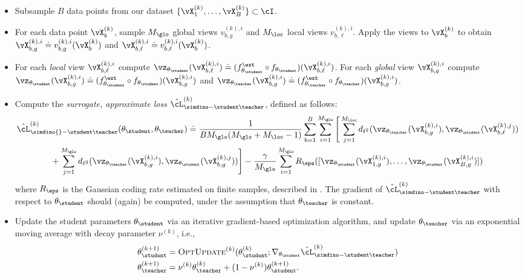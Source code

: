 \documentclass[../../book-main.tex]{subfiles}
\begin{document}
\begin{itemize}
    \item Subsample \(B\) data points from our dataset \(\{\vX_{1}^{(k)}, \dots, \vX_{B}^{(k)}\} \subset \cI\).
    \item For each data point \(\vX_{b}^{(k)}\), sample \(M_{\glo}\) global views \(v_{b, g}^{(k), i}\) and \(M_{\loc}\) local views \(v_{b, \ell}^{(k), i}\). Apply the views to \(\vX_{b}^{(k)}\) to obtain \(\vX_{b, g}^{(k), i} \doteq v_{b, g}^{(k), i}(\vX_{b}^{(k)})\) and \(\vX_{b, \ell}^{(k), i} \doteq v_{b, \ell}^{(k), i}(\vX_{b}^{(k)})\).
    \item For each \textit{local} view \(\vX_{b, \ell}^{(k), i}\) compute \(\vz_{\theta_{\student}}(\vX_{b, \ell}^{(k), i}) \doteq (f_{\theta_{\student}}^{\ext} \circ f_{\theta_{\student}})(\vX_{b, \ell}^{(k), i})\). For each \textit{global} view \(\vX_{b, g}^{(k), i}\) compute \(\vz_{\theta_{\student}}(\vX_{b, g}^{(k), i}) \doteq (f_{\theta_{\student}}^{\ext} \circ f_{\theta_{\student}})(\vX_{b, g}^{(k), i})\) and \(\vz_{\theta_{\teacher}}(\vX_{b, g}^{(k), i}) \doteq (f_{\theta_{\teacher}}^{\ext} \circ f_{\theta_{\teacher}})(\vX_{b, g}^{(k), i})\).
    \item Compute the \textit{surrogate, approximate loss} \(\hat{\cL}_{\simdino-\student\teacher}^{(k)}\), defined as follows: 
    \begin{align}\label{eq:simdino_loss_teacherstudent_empirical}
        &\hat{\cL}_{\simdino{}-\student\teacher}^{(k)}(\theta_{\student}, \theta_{\teacher}) \doteq
        \frac{1}{BM_{\glo}(M_{\glo} + M_{\loc} - 1)}\sum_{b = 1}^{B}\sum_{i = 1}^{M_{\glo}}\Bigg[\sum_{j = 1}^{M_{\loc}}d_{\ell^{2}}(\vz_{\theta_{\teacher}}(\vX_{b, g}^{(k), i}), \vz_{\theta_{\student}}(\vX_{b, \ell}^{(k), j})) \\ 
        &\qquad \qquad + \sum_{j = 1}^{M_{\glo}}d_{\ell^{2}}(\vz_{\theta_{\teacher}}(\vX_{b, g}^{(k), i}), \vz_{\theta_{\student}}(\vX_{b, g}^{(k), j}))\Bigg] - \frac{\gamma}{M_{\glo}}\sum_{i = 1}^{M_{\glo}}R_{\eps}([\vz_{\theta_{\student}}(\vX_{1, g}^{(k), i}), \dots, \vz_{\theta_{\student}}(\vX_{B, g}^{(k), i})])\nonumber
    \end{align}
    where \(R_{\eps}\) is the Gaussian coding rate estimated on finite samples, described in . The gradient of \(\hat{\cL}_{\simdino-\student\teacher}^{(k)}\) with respect to \(\theta_{\student}\) should (again) be computed, under the assumption that \(\theta_{\teacher}\) is constant.
    \item Update the student parameters \(\theta_{\student}\) via an iterative gradient-based optimization algorithm, and update \(\theta_{\teacher}\) via an exponential moving average with decay parameter \(\nu^{(k)}\), i.e., 
    \begin{align}
        \theta_{\student}^{(k + 1)}
        &= \textsc{OptUpdate}^{(k)}(\theta_{\student}^{(k)}; \nabla_{\theta_{\student}}\hat{\cL}_{\simdino-\student\teacher}^{(k)}) \\
        \theta_{\teacher}^{(k + 1)}
        &= \nu^{(k)}\theta_{\teacher}^{(k)} + (1 - \nu^{(k)})\theta_{\student}^{(k + 1)}.
    \end{align}
\end{itemize}
\end{document}
